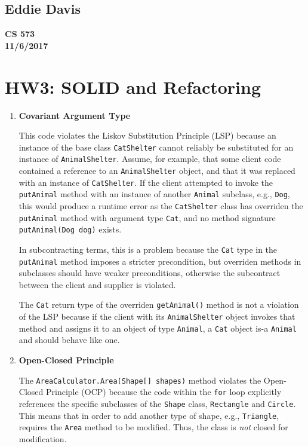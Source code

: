 \documentclass{report}
\begin{document}
\subsection*{Eddie Davis}
\textbf{CS 573}\\
\textbf{11/6/2017}\\

\section*{HW3: SOLID and Refactoring}

\begin{enumerate}
	\item \textbf{Covariant Argument Type}
	
	This code violates the Liskov Substitution Principle (LSP) because an
	instance of the base class \texttt{CatShelter} cannot reliably be
	substituted for an instance of \texttt{AnimalShelter}. Assume,
	for example, that some client code contained a reference to an \texttt{AnimalShelter} object, and that it was replaced with an instance of
	\texttt{CatShelter}. If the client attempted to invoke the \texttt{putAnimal}
	method with an instance of another \texttt{Animal} subclass, e.g.,
    \texttt{Dog}, this would produce a runtime error as the \texttt{CatShelter}
    class has overriden the \texttt{putAnimal} method with argument type
    \texttt{Cat}, and no method signature \texttt{putAnimal(Dog dog)} exists.
	
	In subcontracting terms, this is a problem because the \texttt{Cat} type
	in the \texttt{putAnimal} method imposes a stricter precondition,
	but overriden methods in subclasses should have weaker preconditions,
	otherwise the subcontract between the client and supplier is violated.
	
	The \texttt{Cat} return type of the overriden \texttt{getAnimal()} method
	is not a violation of the LSP because if the client with its
	\texttt{AnimalShelter} object invokes that method and assigns it 
	to an object of type \texttt{Animal}, a \texttt{Cat} object is-a \texttt{Animal} and should behave like one.
	
	\item \textbf{Open-Closed Principle}
	
	The \texttt{AreaCalculator.Area(Shape[] shapes)} method violates the 
	Open-Closed Principle (OCP) because the code within the \texttt{for}
	loop explicitly references the specific subclasses of the \texttt{Shape}
	class, \texttt{Rectangle} and \texttt{Circle}. This means that in order
	to add another type of shape, e.g., \texttt{Triangle}, requires the
	\texttt{Area} method to be modified. Thus, the class is \textit{not}
	closed for modification.
	

\end{enumerate}
\end{document}
